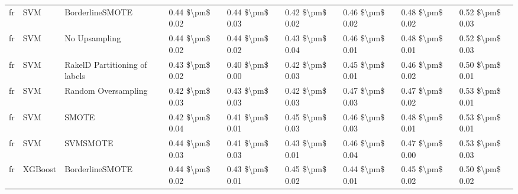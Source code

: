 \begin{tabular}{lllllllll}
      fr &                             SVM &               BorderlineSMOTE & 0.44 \$\textbackslash pm\$ 0.02 &           0.44 \$\textbackslash pm\$ 0.03 &       0.42 \$\textbackslash pm\$ 0.02 &        0.46 \$\textbackslash pm\$ 0.02 &                         0.48 \$\textbackslash pm\$ 0.02 &     0.52 \$\textbackslash pm\$ 0.03 \\
      fr &                             SVM &                 No Upsampling & 0.44 \$\textbackslash pm\$ 0.02 &           0.44 \$\textbackslash pm\$ 0.02 &       0.43 \$\textbackslash pm\$ 0.04 &        0.46 \$\textbackslash pm\$ 0.01 &                         0.48 \$\textbackslash pm\$ 0.01 &     0.52 \$\textbackslash pm\$ 0.03 \\
      fr &                             SVM & RakelD Partitioning of labels & 0.43 \$\textbackslash pm\$ 0.02 &           0.40 \$\textbackslash pm\$ 0.00 &       0.42 \$\textbackslash pm\$ 0.03 &        0.45 \$\textbackslash pm\$ 0.01 &                         0.46 \$\textbackslash pm\$ 0.02 &     0.50 \$\textbackslash pm\$ 0.01 \\
      fr &                             SVM &           Random Oversampling & 0.42 \$\textbackslash pm\$ 0.03 &           0.43 \$\textbackslash pm\$ 0.03 &       0.42 \$\textbackslash pm\$ 0.03 &        0.47 \$\textbackslash pm\$ 0.03 &                         0.47 \$\textbackslash pm\$ 0.02 &     0.53 \$\textbackslash pm\$ 0.01 \\
      fr &                             SVM &                         SMOTE & 0.42 \$\textbackslash pm\$ 0.04 &           0.41 \$\textbackslash pm\$ 0.01 &       0.45 \$\textbackslash pm\$ 0.03 &        0.46 \$\textbackslash pm\$ 0.03 &                         0.48 \$\textbackslash pm\$ 0.01 &     0.53 \$\textbackslash pm\$ 0.01 \\
      fr &                             SVM &                      SVMSMOTE & 0.44 \$\textbackslash pm\$ 0.03 &           0.41 \$\textbackslash pm\$ 0.03 &       0.43 \$\textbackslash pm\$ 0.01 &        0.46 \$\textbackslash pm\$ 0.04 &                         0.47 \$\textbackslash pm\$ 0.00 &     0.53 \$\textbackslash pm\$ 0.03 \\
      fr &                         XGBoost &               BorderlineSMOTE & 0.44 \$\textbackslash pm\$ 0.02 &           0.43 \$\textbackslash pm\$ 0.01 &       0.45 \$\textbackslash pm\$ 0.02 &        0.44 \$\textbackslash pm\$ 0.01 &                         0.45 \$\textbackslash pm\$ 0.02 &     0.50 \$\textbackslash pm\$ 0.02 \\

\end{tabular}
